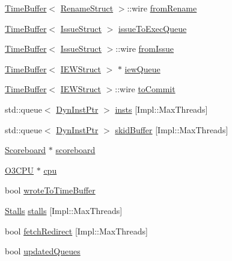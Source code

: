 \begin{DoxyCompactItemize}
\item 
\hyperlink{classTimeBuffer}{TimeBuffer}$<$ \hyperlink{classDefaultIEW_a0c2a89ad2edad9ad605d0461f9b132a5}{RenameStruct} $>$::wire \hyperlink{classDefaultIEW_a2b6b1d4785b92bd378f8a7abc5b7e6b9}{fromRename}
\item 
\hyperlink{classTimeBuffer}{TimeBuffer}$<$ \hyperlink{structIssueStruct}{IssueStruct} $>$ \hyperlink{classDefaultIEW_ae11bca71ca0d33ab0c3b0fafd7bbb758}{issueToExecQueue}
\item 
\hyperlink{classTimeBuffer}{TimeBuffer}$<$ \hyperlink{structIssueStruct}{IssueStruct} $>$::wire \hyperlink{classDefaultIEW_af6f43373b6586aa8c486538fb076effb}{fromIssue}
\item 
\hyperlink{classTimeBuffer}{TimeBuffer}$<$ \hyperlink{classDefaultIEW_a7cf3f052f760b3a8a18623f792c10910}{IEWStruct} $>$ $\ast$ \hyperlink{classDefaultIEW_a034b0868914c304e81c13c4e645d2616}{iewQueue}
\item 
\hyperlink{classTimeBuffer}{TimeBuffer}$<$ \hyperlink{classDefaultIEW_a7cf3f052f760b3a8a18623f792c10910}{IEWStruct} $>$::wire \hyperlink{classDefaultIEW_aaebdc531a44267a7cc38b8bb6d3690d4}{toCommit}
\item 
std::queue$<$ \hyperlink{classDefaultIEW_a028ce10889c5f6450239d9e9a7347976}{DynInstPtr} $>$ \hyperlink{classDefaultIEW_a1b0ce60f9b6c662a2f3df87a3e8b50f8}{insts} \mbox{[}Impl::MaxThreads\mbox{]}
\item 
std::queue$<$ \hyperlink{classDefaultIEW_a028ce10889c5f6450239d9e9a7347976}{DynInstPtr} $>$ \hyperlink{classDefaultIEW_a911bfd7c5c1efbd9f479d2b960078ec1}{skidBuffer} \mbox{[}Impl::MaxThreads\mbox{]}
\item 
\hyperlink{classScoreboard}{Scoreboard} $\ast$ \hyperlink{classDefaultIEW_a265ad15229da2a6a05f908da093b3ed5}{scoreboard}
\item 
\hyperlink{classDefaultIEW_a44622cf06940413482836cb62931ac3f}{O3CPU} $\ast$ \hyperlink{classDefaultIEW_a1379cf882a12ac6fc9eba5da7c84b18b}{cpu}
\item 
bool \hyperlink{classDefaultIEW_a2c7e870d4babdac0dc91fc7ffabd0f3d}{wroteToTimeBuffer}
\item 
\hyperlink{structDefaultIEW_1_1Stalls}{Stalls} \hyperlink{classDefaultIEW_ade48cf321f5741ea8e54e071680cacdc}{stalls} \mbox{[}Impl::MaxThreads\mbox{]}
\item 
bool \hyperlink{classDefaultIEW_aa40219506ff80e4e8c5a9a3b1205b282}{fetchRedirect} \mbox{[}Impl::MaxThreads\mbox{]}
\item 
bool \hyperlink{classDefaultIEW_abdd12485100503d860c2aeda746cfd75}{updatedQueues}

\end{DoxyCompactItemize}
